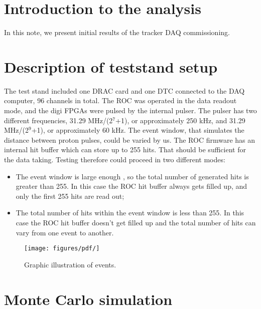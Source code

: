 \section {Introduction to the analysis}

In this note, we present initial results of the tracker DAQ commissioning.
\section{Description of teststand setup}
  The test stand included one DRAC card \cite{DRAC} and one DTC connected to the DAQ computer,
  96 channels in total.
  The ROC was operated in the data readout mode, and the digi FPGAs were pulsed by the internal pulser.
  The pulser has two different frequencies,  31.29 MHz/(2$^7$+1), or approximately 250 kHz,
  and 31.29 MHz/(2$^9$+1), or approximately 60 kHz.
  The event window, that simulates the distance between proton pulses, could be varied by us.
  The ROC firmware has an internal hit buffer which can store up to 255 hits.
  That should be sufficient for the data taking.
  Testing therefore could proceed in two different modes:
  \begin{itemize}
  \item
    The event window is large enough , so the total number of generated hits is greater than 255. In this case
    the ROC hit buffer always gets filled up, and only the first 255 hits are read out;
  \item
    The total number of hits within the event window is less than 255.
    In this case the ROC hit buffer doesn't get filled up and the total number of hits
    can vary from one event to another.
  \end{itemize}

\begin{figure}[!h]
\centering
\texttt{[image: figures/pdf/]}
\caption{Graphic illustration of events.}
\label{fig:3}
\end{figure}
\section{Monte Carlo simulation}\label{MonteCarlo}

